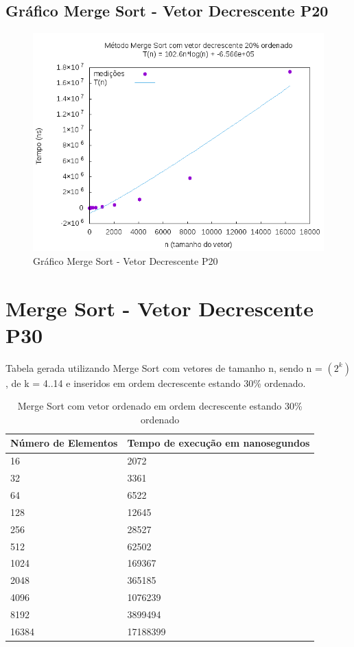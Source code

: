 \documentclass[12pt,a4paper,twoside]{report}
\begin{document}
\subsection{Gráfico Merge Sort - Vetor Decrescente P20}
\begin{figure}[H]
    \centering
    \includegraphics[width=0.7\linewidth]{graficos/MergeSort/vIntDecrescenteP20/vIntDecrescenteP20.png}
  \caption{Gráfico Merge Sort - Vetor Decrescente P20}
\end{figure}

\section{Merge Sort - Vetor Decrescente P30}
Tabela gerada utilizando Merge Sort com vetores de tamanho n, sendo n = $(2^k)$, de k = 4..14 e inseridos em ordem decrescente estando 30\% ordenado.
\begin{table}[H]
\centering
\caption{Merge Sort com vetor ordenado em ordem decrescente estando 30\% ordenado}
\label{my-label}
\begin{tabular}{|l|l|}
\hline
\multicolumn{1}{|c|}{\textbf{Número de Elementos}} & \multicolumn{1}{c|}{\textbf{Tempo de execução em nanosegundos}} \\ \hline
16 & 2072 \\ \hline
32 & 3361 \\ \hline
64 & 6522 \\ \hline
128 & 12645 \\ \hline
256 & 28527 \\ \hline
512 & 62502 \\ \hline
1024 & 169367 \\ \hline
2048 & 365185 \\ \hline
4096 & 1076239 \\ \hline
8192 & 3899494 \\ \hline
16384 & 17188399 \\ \hline
\end{tabular}
\end{table}
\end{document}
